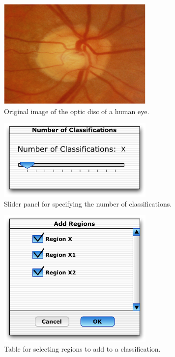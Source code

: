 \documentclass[11pt, twocolumn]{article}
\begin{document}
\begin{figure}[htbp] %
   \centering
   \includegraphics[width=3in]{opticDisc.png} 
   \caption{Original image of the optic disc of a human eye.}
   \label{originalOpticDisc}
\end{figure}


\begin{figure}[htbp] %
   \centering
   \includegraphics[width=3in]{numberOfClassificationsSlider.png} 
   \caption{Slider panel for specifying the number of classifications.}
   \label{numberOfClassificationsSlider}
\end{figure}

\begin{figure}[htbp] %
   \centering
   \includegraphics[width=3in]{addRegionsCheckBoxes.png} 
   \caption{Table for selecting regions to add to a classification.}
   \label{addRegionsCheckBoxes}
\end{figure}
\end{document}
